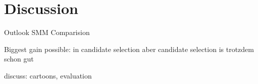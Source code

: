 \section{Discussion}
\label{sec_discussion}

Outlook SMM Comparision

Biggest gain possible: in candidate selection
aber candidate selection is trotzdem schon gut

discuss: cartoons, evaluation
